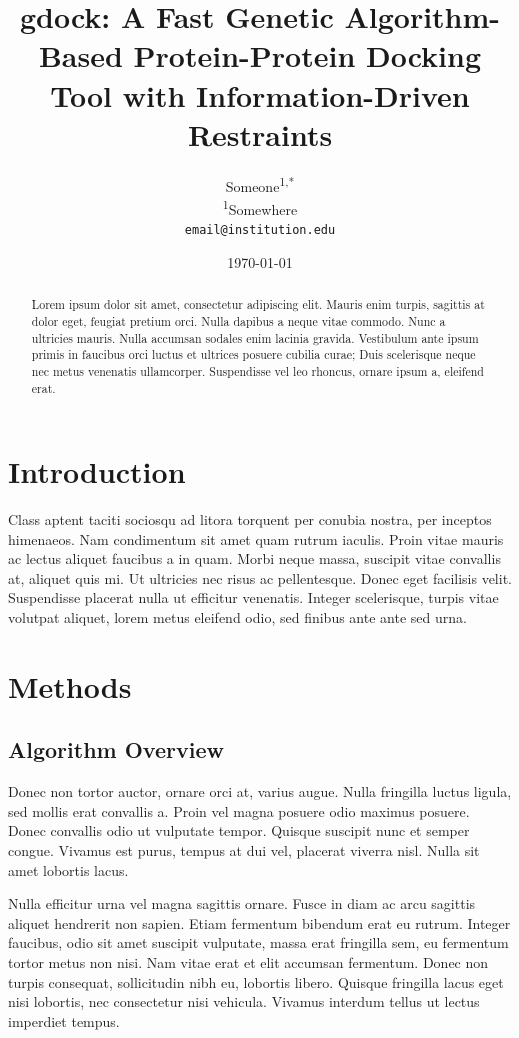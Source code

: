\documentclass[11pt,a4paper]{article}
\title{gdock: A Fast Genetic Algorithm-Based Protein-Protein Docking Tool with Information-Driven Restraints}
\author{
  Someone\textsuperscript{1,*} \\
  \small \textsuperscript{1}Somewhere \\
  \small \texttt{email@institution.edu}
}
\date{\today}
\begin{document}
\maketitle

\begin{abstract}
Lorem ipsum dolor sit amet, consectetur adipiscing elit. Mauris enim turpis, sagittis at dolor eget, feugiat pretium orci. Nulla dapibus a neque vitae commodo. Nunc a ultricies mauris. Nulla accumsan sodales enim lacinia gravida. Vestibulum ante ipsum primis in faucibus orci luctus et ultrices posuere cubilia curae; Duis scelerisque neque nec metus venenatis ullamcorper. Suspendisse vel leo rhoncus, ornare ipsum a, eleifend erat.

\end{abstract}

\section{Introduction}
Class aptent taciti sociosqu ad litora torquent per conubia nostra, per inceptos himenaeos. Nam condimentum sit amet quam rutrum iaculis. Proin vitae mauris ac lectus aliquet faucibus a in quam. Morbi neque massa, suscipit vitae convallis at, aliquet quis mi. Ut ultricies nec risus ac pellentesque. Donec eget facilisis velit. Suspendisse placerat nulla ut efficitur venenatis. Integer scelerisque, turpis vitae volutpat aliquet, lorem metus eleifend odio, sed finibus ante ante sed urna. 

\section{Methods}

\subsection{Algorithm Overview}

 Donec non tortor auctor, ornare orci at, varius augue. Nulla fringilla luctus ligula, sed mollis erat convallis a. Proin vel magna posuere odio maximus posuere. Donec convallis odio ut vulputate tempor. Quisque suscipit nunc et semper congue. Vivamus est purus, tempus at dui vel, placerat viverra nisl. Nulla sit amet lobortis lacus.

Nulla efficitur urna vel magna sagittis ornare. Fusce in diam ac arcu sagittis aliquet hendrerit non sapien. Etiam fermentum bibendum erat eu rutrum. Integer faucibus, odio sit amet suscipit vulputate, massa erat fringilla sem, eu fermentum tortor metus non nisi. Nam vitae erat et elit accumsan fermentum. Donec non turpis consequat, sollicitudin nibh eu, lobortis libero. Quisque fringilla lacus eget nisi lobortis, nec consectetur nisi vehicula. Vivamus interdum tellus ut lectus imperdiet tempus.
\end{document}
